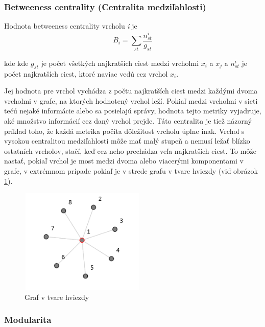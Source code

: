 \documentclass[slovak,master,public,dept460,male,cpdeclaration,oneside]{diploma}
\begin{document}
\subsubsection{Betweeness centrality (Centralita medziľahlosti)}

\begin{definition}
Hodnota betweeness centrality vrcholu \textit{i} je 
\begin{equation}
{B_{i} = \sum_{st}^{}\frac{n^{i}_{st}}{g_{st}}}
\label{equation_closeness_centrality}
\end{equation}
\end{definition}

kde kde ${g_{st}}$ je počet všetkých najkratších ciest medzi vrcholmi ${x_{i}}$ a ${x_{j}}$ a ${n^{i}_{st}}$ je počet najkratších ciest, ktoré naviac vedú cez vrchol ${x_{i}}$. 


Jej hodnota pre vrchol vychádza z počtu najkratších ciest medzi každými dvoma vrcholmi v grafe, na ktorých hodnotený vrchol leží. Pokiaľ medzi vrcholmi v sieti tečú nejaké informácie alebo sa posielajú správy, hodnota tejto metriky vyjadruje, aké množstvo informácií cez daný vrchol prejde. Táto centralita je tiež názorný príklad toho, že každá metrika počíta dôležitost vrcholu úplne inak. Vrchol s vysokou centralitou medziľahlosti môže mať malý stupeň a nemusí ležať blízko ostatních vrcholov, stačí, keď cez neho  prechádza veľa najkratších ciest. To môže nastať, pokiaľ vrchol je most medzi dvoma alebo viacerými komponentami v grafe, v extrémnom prípade pokiaľ je v strede grafu v tvare hviezdy (viď obrázok \ref{graf_v_tvare_hviezdy}).


\begin{figure}[H]
\centering
\includegraphics[width=6cm, height=5cm]{figures/graph_star}
\caption{Graf v tvare hviezdy}
\label{graf_v_tvare_hviezdy}
\end{figure}

\subsubsection{Modularita}
\end{document}
